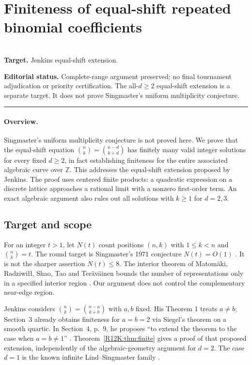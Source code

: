 \documentclass[11pt,a4paper]{article}
\begin{document}
\section{Finiteness of equal-shift repeated binomial coefficients}
\label{section:R12K}
\\[3pt]
\noindent\textbf{Target.} Jenkins equal-shift extension.

\noindent\textbf{Editorial status.} Complete-range argument preserved; no final tournament adjudication or priority certification. The all-$d\ge2$ equal-shift extension is a separate target. It does not prove Singmaster's uniform multiplicity conjecture.

\smallskip\hrule\medskip



\begingroup
\newcommand{\Z}{\mathbb Z}
\setcounter{equation}{0}
\renewcommand{\theequation}{\thesection.\arabic{equation}}
\renewcommand{\theHequation}{R12K.\arabic{equation}}
\paragraph{Overview.}
Singmaster's uniform multiplicity conjecture is not proved here. We prove that the equal-shift equation
\(\binom nk=\binom{n-d}{k+d}\) has finitely many valid integer solutions for every fixed \(d\ge2\), in fact establishing finiteness for the entire associated algebraic curve over \(\Z\). This addresses the equal-shift extension proposed by Jenkins. The proof uses centered finite products: a quadratic expression on a discrete lattice approaches a rational limit with a nonzero first-order term. An exact algebraic argument also rules out all solutions with \(k\ge1\) for \(d=2,3\).


\subsection{Target and scope}
For an integer \(t>1\), let \(N(t)\) count positions \((n,k)\) with \(1\le k<n\) and \(\binom nk=t\). The round target is Singmaster's 1971 conjecture \(N(t)=O(1)\) \cite{R12K:singmaster1971}. It is not the sharper assertion \(N(t)\le8\). The interior theorem of Matom\"aki, Radziwi\l\l, Shao, Tao and Ter\"av\"ainen bounds the number of representations only in a specified interior region \cite[Theorem 1.3]{R12K:mrstt}. Our argument does not control the complementary near-edge region.

Jenkins considers \(\binom nk=\binom{n-a}{k+b}\) with \(a,b\) fixed. His Theorem 1 treats \(a\ne b\); Section~3 already obtains finiteness for \(a=b=2\) via Siegel's theorem on a smooth quartic. In Section~4, p.~9, he proposes \textquotedblleft to extend the theorem to the case when \(a=b\ne1\)\textquotedblright{} \cite{R12K:jenkins}. Theorem~\ref{R12K:thm:finite} gives a proof of that proposed extension, independently of the algebraic-geometry argument for \(d=2\). The case \(d=1\) is the known infinite Lind--Singmaster family \cite{R12K:lind,R12K:singmaster1975}.
\end{document}
